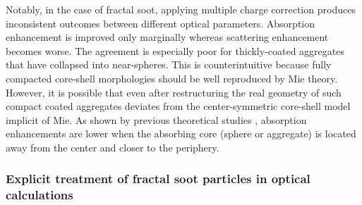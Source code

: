 \documentclass[12pt,authoryear]{elsarticle}
\begin{document}
Notably, in the case of fractal soot, applying multiple charge correction produces inconsistent outcomes between different optical parameters. Absorption enhancement is improved only marginally whereas scattering enhancement becomes worse. The agreement is especially poor for thickly-coated aggregates that have collapsed into near-spheres. This is counterintuitive because fully compacted core-shell morphologies should be well reproduced by Mie theory. However, it is possible that even after restructuring the real geometry of such compact coated aggregates deviates from the center-symmetric core-shell model implicit of Mie. As shown by previous theoretical studies \citep{RN71,RN72}, absorption enhancements are lower when the absorbing core (sphere or aggregate) is located away from the center and closer to the periphery.

\subsubsection{Explicit treatment of fractal soot particles in optical calculations}


\end{document}
